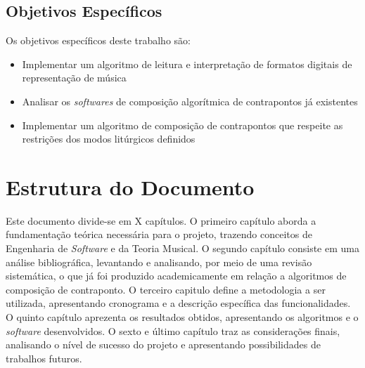       \subsection*{Objetivos Específicos}

        Os objetivos específicos deste trabalho são:

        \begin{itemize}
        \item Implementar um algoritmo de leitura e interpretação de formatos digitais de representação de música
        \item Analisar os \textit{softwares} de composição algorítmica de contrapontos já existentes
        \item Implementar um algoritmo de composição de contrapontos que respeite as restrições dos modos litúrgicos definidos
        \end{itemize}

  \section*{Estrutura do Documento}

    Este documento divide-se em X capítulos. O primeiro capítulo aborda a fundamentação teórica necessária para o projeto, trazendo conceitos de Engenharia de \textit{Software} e da Teoria Musical. O segundo capítulo consiste em uma análise bibliográfica, levantando e analisando, por meio de uma revisão sistemática, o que já foi produzido academicamente em relação a algoritmos de composição de contraponto. O terceiro capitulo define a metodologia a ser utilizada, apresentando cronograma e a descrição específica das funcionalidades. O quinto capítulo aprezenta os resultados obtidos, apresentando os algoritmos e o \textit{software} desenvolvidos. O sexto e último capítulo traz as considerações finais, analisando o nível de sucesso do projeto e apresentando possibilidades de trabalhos futuros.
